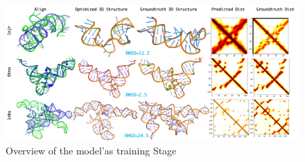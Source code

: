 \begin{figure}[]
    \begin{center}
    \includegraphics[width=1.0\textwidth]{2.png}
    \caption{Overview of the model'as training Stage}\label{Trainig Stage}
    \end{center}
\end{figure}

